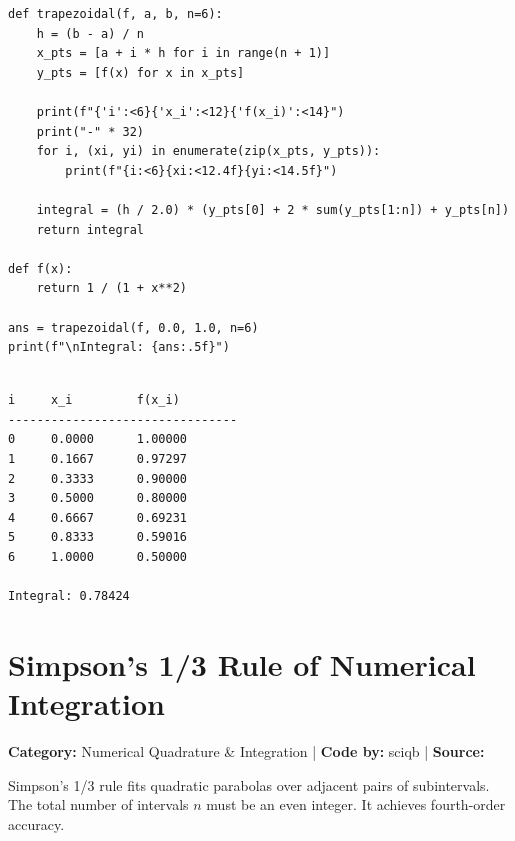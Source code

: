 \documentclass[10pt,a4paper]{report}
\begin{document}
\begin{tcolorbox}[colback=codebg,colframe=secondary,title=\textbf{Python Implementation (Step-by-Step Functions)},boxrule=1pt,arc=2mm]
\begin{lstlisting}[style=python_detailed]
def trapezoidal(f, a, b, n=6):
    h = (b - a) / n
    x_pts = [a + i * h for i in range(n + 1)]
    y_pts = [f(x) for x in x_pts]

    print(f"{'i':<6}{'x_i':<12}{'f(x_i)':<14}")
    print("-" * 32)
    for i, (xi, yi) in enumerate(zip(x_pts, y_pts)):
        print(f"{i:<6}{xi:<12.4f}{yi:<14.5f}")

    integral = (h / 2.0) * (y_pts[0] + 2 * sum(y_pts[1:n]) + y_pts[n])
    return integral

def f(x):
    return 1 / (1 + x**2)

ans = trapezoidal(f, 0.0, 1.0, n=6)
print(f"\nIntegral: {ans:.5f}")


\end{lstlisting}
\end{tcolorbox}

\begin{tcolorbox}[colback=termbg,colframe=primary,title=\textbf{Program Execution Output \& Convergence Table},boxrule=1pt,arc=2mm]
\begin{lstlisting}[style=terminal_output]
i     x_i         f(x_i)        
--------------------------------
0     0.0000      1.00000       
1     0.1667      0.97297       
2     0.3333      0.90000       
3     0.5000      0.80000       
4     0.6667      0.69231       
5     0.8333      0.59016       
6     1.0000      0.50000       

Integral: 0.78424
\end{lstlisting}
\end{tcolorbox}

\newpage


\section{Simpson's 1/3 Rule of Numerical Integration}
\textbf{Category:} \textcolor{secondary}{Numerical Quadrature \& Integration} \quad | \quad \textbf{Code by:} \textcolor{secondary}{sciqb} \quad | \quad \textbf{Source:} \texttt{}

Simpson's 1/3 rule fits quadratic parabolas over adjacent pairs of subintervals. The total number of intervals $n$ must be an even integer. It achieves fourth-order accuracy.
\end{document}
